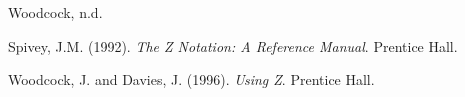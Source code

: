 \documentclass[a4paper,10pt,fleqn]{article}
\begin{document}
\setlength{\leftskip}{0pt}

\begin{thebibliography}{Woodcock, n.d.}

 Spivey, J.M. (1992). \textit{The Z Notation: A Reference Manual}. Prentice Hall.

 Woodcock, J. and Davies, J. (1996). \textit{Using Z}. Prentice Hall.

\end{thebibliography}
\end{document}
